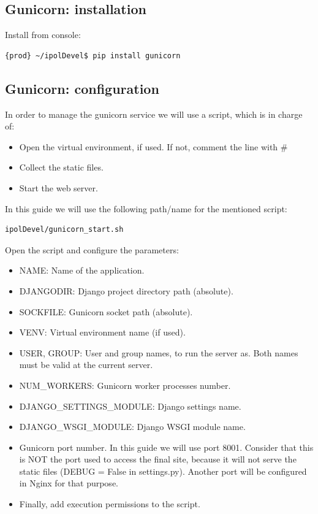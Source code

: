\documentclass[a4paper,12pt]{article}
\begin{document}
\subsection{Gunicorn: installation}

Install from console:
\begin{lstlisting}[language=Bash]
{prod} ~/ipolDevel$ pip install gunicorn
\end{lstlisting}

\subsection{Gunicorn: configuration}
In order to manage the gunicorn service we will use a script, which is in charge of:
\begin{itemize}
    \item Open the virtual environment, if used. If not, comment the line with \#
    \item Collect the static files.
    \item Start the web server.
\end{itemize}

In this guide we will use the following path/name for the mentioned script:
\begin{lstlisting}[language=Bash]
ipolDevel/gunicorn_start.sh
\end{lstlisting}

Open the script and configure the parameters:
\begin{itemize}
    \item NAME: Name of the application.
    \item DJANGODIR: Django project directory path (absolute).
    \item SOCKFILE: Gunicorn socket path (absolute).
    \item VENV: Virtual environment name (if used).
    \item USER, GROUP: User and group names, to run the server as. Both names must be valid at the current server.
    \item NUM\_WORKERS: Gunicorn worker processes number.
    \item DJANGO\_SETTINGS\_MODULE: Django settings name.
    \item DJANGO\_WSGI\_MODULE: Django WSGI module name.
    \item Gunicorn port number. In this guide we will use port 8001. Consider that this is NOT the port used to access the final site, because it will not serve the static files (DEBUG = False in settings.py). Another port will be configured in Nginx for that purpose.
    \item Finally, add execution permissions to the script.
\end{itemize}
\end{document}
